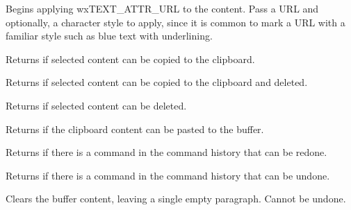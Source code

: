 
Begins applying wxTEXT\_ATTR\_URL to the content. Pass a URL and optionally, a character style to apply,
since it is common to mark a URL with a familiar style such as blue text with underlining.

\label{wxrichtextctrlcancopy}


Returns \true if selected content can be copied to the clipboard.

\label{wxrichtextctrlcancut}


Returns \true if selected content can be copied to the clipboard and deleted.

\label{wxrichtextctrlcandeleteselection}


Returns \true if selected content can be deleted.

\label{wxrichtextctrlcanpaste}


Returns \true if the clipboard content can be pasted to the buffer.

\label{wxrichtextctrlcanredo}


Returns \true if there is a command in the command history that can be redone.

\label{wxrichtextctrlcanundo}


Returns \true if there is a command in the command history that can be undone.

\label{wxrichtextctrlclear}


Clears the buffer content, leaving a single empty paragraph. Cannot be undone.

\label{wxrichtextctrlclearliststyle}

